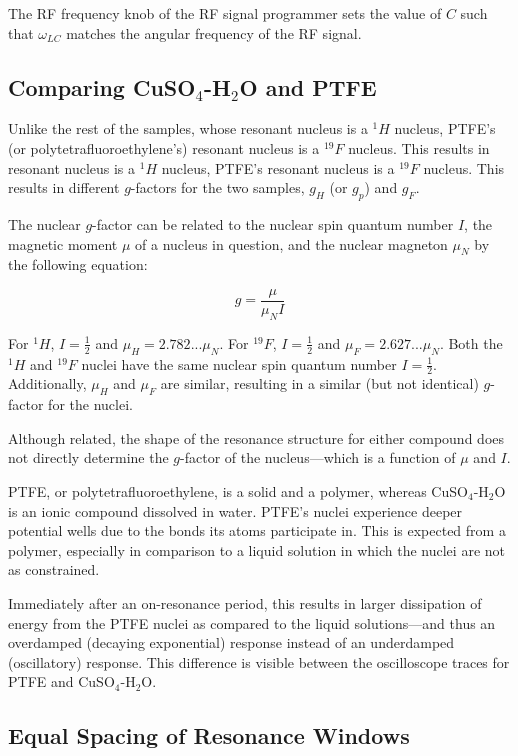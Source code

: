 \documentclass[11pt]{article}
\begin{document}
The RF frequency knob of the RF signal programmer sets the value of
$C$ such that $\omega_{LC}$ matches the angular frequency of the RF
signal.

\subsection*{Comparing CuSO$_4$-H$_2$O and PTFE}

Unlike the
rest of the samples, whose resonant nucleus is a ${}^1H$ nucleus,
PTFE's (or polytetrafluoroethylene's) resonant nucleus is a
${}^{19}F$ nucleus. This results in
resonant nucleus is a ${}^1H$ nucleus, PTFE's resonant nucleus is a
${}^{19}F$ nucleus. This results in different $g$-factors for the two
samples, $g_H$ (or $g_p$) and $g_F$.

The nuclear $g$-factor can be related to the nuclear spin quantum
number $I$, the magnetic moment $\mu$ of a nucleus in question, and
the nuclear magneton $\mu_N$ by the following equation:

$$
g = \frac{\mu}{\mu_N I}
$$

For ${}^1H$, $I = \frac{1}{2}$ and $\mu_H = 2.782 ... \mu_N$. For
${}^{19}F$, $I = \frac{1}{2}$ and $\mu_F = 2.627... \mu_N$. Both the
${}^1H$ and ${}^{19}F$ nuclei have the same nuclear spin quantum number
$I = \frac{1}{2}$. Additionally, $\mu_H$ and $\mu_F$ are similar,
resulting in a similar (but not identical) $g$-factor for the nuclei.

Although related, the shape of the resonance structure for either
compound does not directly determine the $g$-factor of the
nucleus---which is a function of $\mu$ and $I$.

PTFE, or polytetrafluoroethylene, is a solid and a polymer, whereas
CuSO$_4$-H$_2$O is an ionic compound dissolved in water. PTFE's
nuclei experience deeper potential wells due to
the bonds its atoms participate in. This is expected from a polymer,
especially in comparison to a liquid solution in which the nuclei are
not as constrained.

Immediately after an on-resonance period, this results
in larger dissipation of energy from the PTFE nuclei as compared to
the liquid solutions---and thus an overdamped (decaying exponential)
response instead of an underdamped (oscillatory) response. This
difference is visible between the oscilloscope traces for PTFE and
CuSO$_4$-H$_2$O.

\subsection*{Equal Spacing of Resonance Windows}
\end{document}
